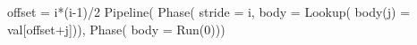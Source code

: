 \begin{juliacode}
offset = i*(i-1)/2
Pipeline(
  Phase(
    stride = i,
    body = Lookup(
      body(j) = val[offset+j])),
  Phase(
    body = Run(0)))
\end{juliacode}